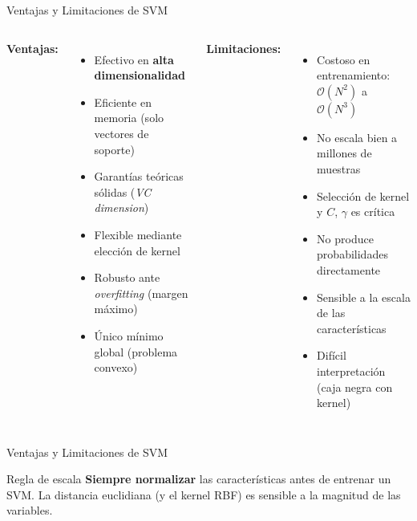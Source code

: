 \documentclass[aspectratio=169,xcolor=dvipsnames]{beamer}
\begin{document}
\begin{frame}{Ventajas y Limitaciones de SVM}
    \begin{columns}
        \textbf{\color{OliveGreen}Ventajas:}
        \begin{itemize}
            \item Efectivo en \textbf{alta dimensionalidad}
            \item Eficiente en memoria (solo vectores de soporte)
            \item Garantías teóricas sólidas (\textit{VC dimension})
            \item Flexible mediante elección de kernel
            \item Robusto ante \textit{overfitting} (margen máximo)
            \item Único mínimo global (problema convexo)
        \end{itemize}

        \textbf{\color{red!70!black}Limitaciones:}
        \begin{itemize}
            \item Costoso en entrenamiento: $\mathcal{O}(N^2)$ a $\mathcal{O}(N^3)$
            \item No escala bien a millones de muestras
            \item Selección de kernel y $C$, $\gamma$ es crítica
            \item No produce probabilidades directamente
            \item Sensible a la escala de las características
            \item Difícil interpretación (caja negra con kernel)
        \end{itemize}
    \end{columns}
\end{frame}
\begin{frame}{Ventajas y Limitaciones de SVM}

    \vspace{0.3em}
    \begin{alertblock}{Regla de escala}
        \textbf{Siempre normalizar} las características antes de entrenar un SVM. La distancia euclidiana (y el kernel RBF) es sensible a la magnitud de las variables.
    \end{alertblock}
\end{frame}
\end{document}
